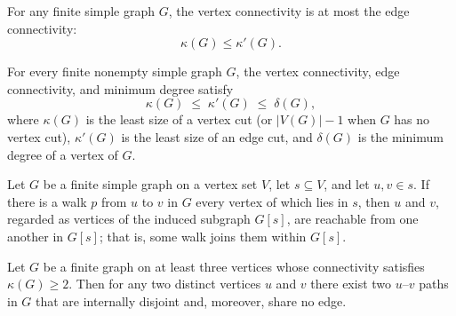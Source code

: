 \begin{theorem}
\label{SimpleGraph.vertexConnectivity_le_edgeConnectivity}
For any finite simple graph $G$, the vertex connectivity is at most the edge
connectivity:
\[
\kappa(G) \le \kappa'(G).
\]
\end{theorem}

\begin{theorem}
\label{SimpleGraph.whitney_inequalities}
\leanok
{}
For every finite nonempty simple graph $G$, the vertex connectivity, edge connectivity,
and minimum degree satisfy
\[
\kappa(G) \;\le\; \kappa'(G) \;\le\; \delta(G),
\]
where $\kappa(G)$ is the least size of a vertex cut (or $|V(G)| - 1$ when $G$ has no
vertex cut), $\kappa'(G)$ is the least size of an edge cut, and $\delta(G)$ is the
minimum degree of a vertex of $G$.
\end{theorem}

\begin{theorem}
\label{SimpleGraph.reachable_induce_of_support_subset}
\leanok
Let $G$ be a finite simple graph on a vertex set $V$, let $s \subseteq V$, and let $u, v
\in s$. If there is a walk $p$ from $u$ to $v$ in $G$ every vertex of which lies in $s$,
then $u$ and $v$, regarded as vertices of the induced subgraph $G[s]$, are reachable
from one another in $G[s]$; that is, some walk joins them within $G[s]$.
\end{theorem}

\begin{theorem}
\label{SimpleGraph.exists_two_internally_disjoint_paths_of_two_connected}
Let $G$ be a finite graph on at least three vertices whose connectivity satisfies
$\kappa(G) \ge 2$. Then for any two distinct vertices $u$ and $v$ there exist two
$u$–$v$ paths in $G$ that are internally disjoint and, moreover, share no edge.
\end{theorem}


